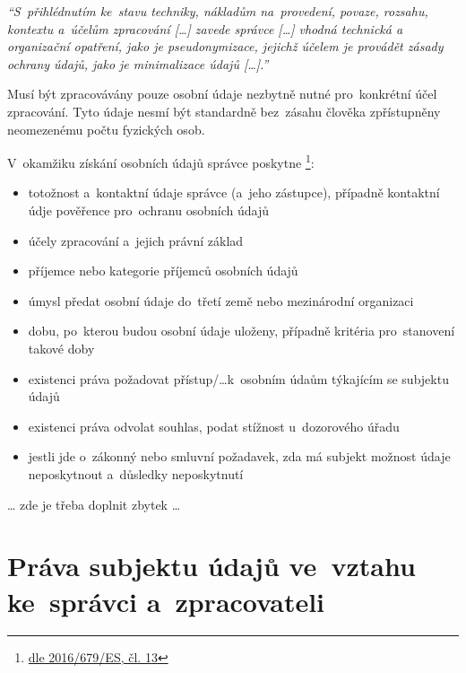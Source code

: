 \emph{\enquote{S~přihlédnutím ke~stavu techniky, nákladům na~provedení, povaze, rozsahu, kontextu a~účelům zpracování [\dots] zavede správce [\dots] vhodná technická a organizační opatření, jako je pseudonymizace, jejichž účelem je provádět zásady ochrany údajů, jako je minimalizace údajů [\dots].}}

Musí být zpracovávány pouze osobní údaje nezbytně nutné pro~konkrétní účel zpracování. Tyto údaje nesmí být standardně bez~zásahu člověka zpřístupněny neomezenému počtu fyzických osob.

\vspace*{1em}

V~okamžiku získání osobních údajů správce poskytne%
\footnote{%
	\href{https://eur-lex.europa.eu/legal-content/CS/TXT/HTML/?uri=CELEX:32016R0679\#d1e2243-1-1}{dle 2016/679/ES, čl. 13}%
}:

\begin{itemize}[noitemsep]
\item totožnost a~kontaktní údaje správce (a~jeho zástupce), případně kontaktní údje pověřence pro~ochranu osobních údajů
\item účely zpracování a~jejich právní základ
\item příjemce nebo kategorie příjemců osobních údajů
\item úmysl předat osobní údaje do~třetí země nebo mezinárodní organizaci
\item dobu, po~kterou budou osobní údaje uloženy, případně kritéria pro~stanovení takové doby
\item existenci práva požadovat přístup/\dots k~osobním údaům týkajícím se subjektu údajů
\item existenci práva odvolat souhlas, podat stížnost u~dozorového úřadu
\item jestli jde o~zákonný nebo smluvní požadavek, zda má subjekt možnost údaje neposkytnout a~důsledky neposkytnutí
\end{itemize}

\begin{center}
{\huge \dots} zde je třeba doplnit zbytek {\huge \dots}
\end{center}

\clearpage
\section{Práva subjektu údajů ve~vztahu ke~správci a~zpracovateli}

